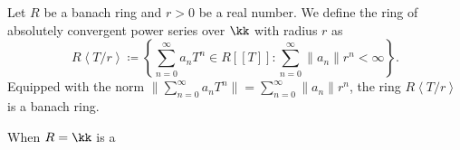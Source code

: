     \begin{example}\label{eg:ring_of_absolutely_convergent_power_series_as_banach_rings}
        Let \(R\) be a banach ring and \(r > 0\) be a real number.
        We define the ring of absolutely convergent power series over \(\kk\) with radius \(r\) as
        \[ R\left<T/r\right> \coloneqq \left\{\sum_{n=0}^{\infty} a_n T^n \in R[[T]] : \sum_{n=0}^{\infty} \|a_n\| r^n < \infty \right\}. \]
        Equipped with the norm \(\|\sum_{n=0}^{\infty} a_n T^n\| = \sum_{n=0}^{\infty} \|a_n\| r^n\), the ring \(R\left<T/r\right>\) is a banach ring.

        When \(R = \kk\) is a 
    \end{example}

